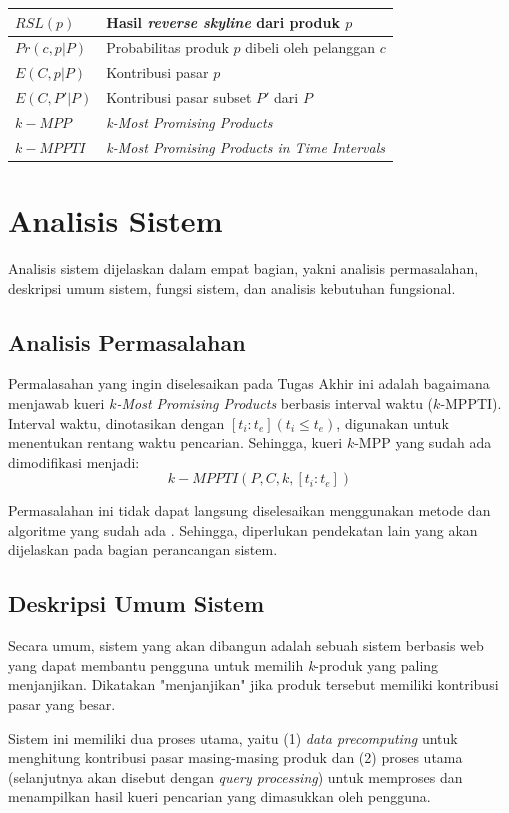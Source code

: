 \begin{longtable}{| p{3cm} | p{7cm} |}
	$RSL(p)$ & Hasil \textit{reverse skyline} dari produk $p$\\ \hline
	$Pr(c, p|P)$ & Probabilitas produk $p$ dibeli oleh pelanggan $c$ \\ \hline
	$E(C, p|P)$ & Kontribusi pasar $p$\\ \hline
	$E(C, P'|P)$ & Kontribusi pasar subset $P'$ dari $P$ \\ \hline
	$k-MPP$ & \textit{k-Most Promising Products} \\ \hline
	$k-MPPTI$ & \textit{k-Most Promising Products in Time Intervals} \\ \hline
\end{longtable}

\section{Analisis Sistem}
\tab Analisis sistem dijelaskan dalam empat bagian, yakni analisis permasalahan, deskripsi umum sistem, fungsi sistem, dan analisis kebutuhan fungsional.

\subsection{Analisis Permasalahan}
\tab Permalasahan yang ingin diselesaikan pada Tugas Akhir ini adalah bagaimana menjawab kueri \textit{$k$-Most Promising Products} berbasis interval waktu ($k$-MPPTI). Interval waktu, dinotasikan dengan $[t_i:t_e ](t_i \leq t_e)$, digunakan untuk menentukan rentang waktu pencarian. Sehingga, kueri $k$-MPP yang sudah ada \cite{kmpp} dimodifikasi menjadi:
\begin{equation}\label{eq:kmppts}
k-MPPTI(P, C, k, [t_i:t_e])
\end{equation} 

Permasalahan ini tidak dapat langsung diselesaikan menggunakan metode dan algoritme yang sudah ada \cite{kmpp}. Sehingga, diperlukan pendekatan lain yang akan dijelaskan pada bagian perancangan sistem.

\subsection{Deskripsi Umum Sistem}
\tab Secara umum, sistem yang akan dibangun adalah sebuah sistem berbasis web yang dapat membantu pengguna untuk memilih \textit{k}-produk yang paling menjanjikan. Dikatakan "menjanjikan" jika produk tersebut memiliki kontribusi pasar yang besar.

Sistem ini memiliki dua proses utama, yaitu (1) \textit{data precomputing} untuk menghitung kontribusi pasar masing-masing produk dan (2) proses utama (selanjutnya akan disebut dengan \textit{query processing}) untuk memproses dan menampilkan hasil kueri pencarian yang dimasukkan oleh pengguna.

